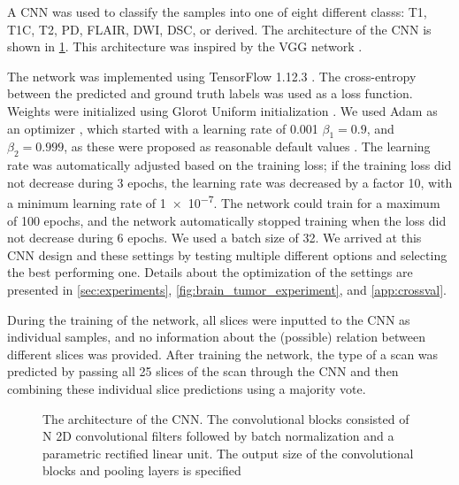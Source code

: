 A \gls{CNN} was used to classify the \glspl{sample} into one of eight different \glspl{class}: \gls{T1}, \gls{T1C}, \gls{T2}, \gls{PD}, \gls{FLAIR}, \gls{DWI}, \gls{DSC}, or derived.
The architecture of the \gls{CNN} is shown in \cref{fig:sequence_architecture}.
This architecture was inspired by the VGG network \autocite{simonyan2014very}.

The network was implemented using TensorFlow 1.12.3 \autocite{abadi2016tensorflow}.
The cross-entropy between the predicted and ground truth labels was used as a loss function.
Weights were initialized using Glorot Uniform initialization \autocite{glorot2010understanding}.
We used Adam as an optimizer \autocite{kingma2014adam}, which started with a learning rate of \num{0.001} $\beta_1 = 0.9$, and $\beta_2=0.999$, as these were proposed as reasonable default values \autocite{kingma2014adam}.
The learning rate was automatically adjusted based on the training loss; if the training loss did not decrease during \num{3} epochs, the learning rate was decreased by a factor \num{10}, with a minimum learning rate of \num{1e-7}.
The network could train for a maximum of \num{100} epochs, and the network automatically stopped training when the loss did not decrease during \num{6} epochs.
We used a batch size of \num{32}.
We arrived at this \gls{CNN} design and these settings by testing multiple different options and selecting the best performing one.
Details about the optimization of the settings are presented in \cref{sec:experiments}, \cref{fig:brain_tumor_experiment}, and \cref{app:crossval}.

During the training of the network, all \glspl{slice} were inputted to the \gls{CNN} as individual \glspl{sample}, and no information about the (possible) relation between different \glspl{slice} was provided.
After training the network, the \gls{type} of a \gls{scan} was predicted by passing all \num{25} \glspl{slice} of the \gls{scan} through the \gls{CNN} and then combining these individual \gls{slice} predictions using a majority vote.

\begin{figure}
\centering


\caption{The architecture of the \gls{CNN}. The convolutional blocks consisted of N 2D convolutional filters followed by batch normalization and a parametric rectified linear unit.
The output size of the convolutional blocks and pooling layers is specified}
\label{fig:sequence_architecture}
\end{figure}

